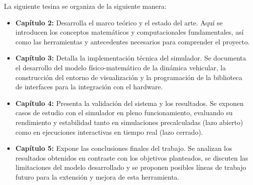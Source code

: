 La siguiente tesina se organiza de la siguiente manera:

\begin{itemize}
    \item \textbf{Capítulo 2:} Desarrolla el marco teórico y el estado del arte. Aquí se introducen los conceptos matemáticos y computacionales fundamentales, así como las herramientas y antecedentes necesarios para comprender el proyecto.
    
    \item \textbf{Capítulo 3:} Detalla la implementación técnica del simulador. Se documenta el desarrollo del modelo físico-matemático de la dinámica vehicular, la construcción del entorno de visualización y la programación de la biblioteca de interfaces para la integración con el hardware.
    
    \item \textbf{Capítulo 4:} Presenta la validación del sistema y los resultados. Se exponen casos de estudio con el simulador en pleno funcionamiento, evaluando su rendimiento y estabilidad tanto en simulaciones precalculadas (lazo abierto) como en ejecuciones interactivas en tiempo real (lazo cerrado).
    
    \item \textbf{Capítulo 5:} Expone las conclusiones finales del trabajo. Se analizan los resultados obtenidos en contraste con los objetivos planteados, se discuten las limitaciones del modelo desarrollado y se proponen posibles líneas de trabajo futuro para la extensión y mejora de esta herramienta.
\end{itemize}